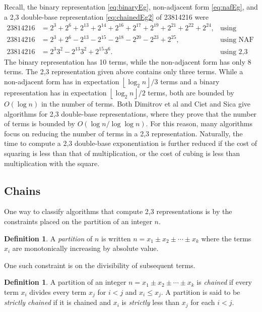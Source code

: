 \documentclass{ucalgthes1}
\theoremstyle{definition}
\newtheorem{defn}[thm]{Definition}
\newcommand{\floor}[1]{\left\lfloor #1 \right\rfloor}
\begin{document}
Recall, the binary representation \eqref{eq:binaryEg}, non-adjacent form \eqref{eq:nafEg}, and a 2,3 double-base representation \eqref{eq:chainedEg2} of 23814216 were
\begin{align*}
	23814216 &= 2^3+2^6+2^{13}+2^{14}+2^{16}+2^{17}+2^{19}+2^{21}+2^{22}+2^{24}, & \mbox{using binary} \\
	23814216 &= 2^3+2^6-2^{13}-2^{15}-2^{18}-2^{20}-2^{23}+2^{25}, & \mbox{using NAF} \\
	23814216 &= 2^3 3^2 -2^{13} 3^2 +2^{15} 3^6. & \mbox{using 2,3 DBNS}
\end{align*}
The binary representation has 10 terms, while the non-adjacent form has only 8 terms.  The 2,3 representation given above contains only three terms.  While a non-adjacent form has in expectation $\floor{\log_2 n}/3$ terms and a binary representation has in expectation $\floor{\log_2 n}/2$ terms, both are bounded by $O(\log n)$ in the number of terms.  Both Dimitrov et al \cite{Dimitrov2008} and Ciet and Sica \cite{Ciet2005} give algorithms for 2,3 double-base representations, where they prove that the number of terms is bounded by $O(\log n / \log \log n)$.  For this reason, many algorithms focus on reducing the number of terms in a 2,3 representation.   Naturally, the time to compute a 2,3 double-base exponentiation is further reduced if the cost of squaring is less than that of multiplication, or the cost of cubing is less than multiplication with the square.

\bigbreak
\subsection{Chains}
\label{subsec:dbnsChains}

One way to classify algorithms that compute 2,3 representations is by the constraints placed on the partition of an integer $n$.

\begin{defn}
A \emph{partition} of $n$ is written $n = x_1 \pm x_2 \pm \cdots \pm x_k$ where the terms $x_i$ are monotonically increasing by absolute value.
\end{defn}

\noindent
One such constraint is on the divisibility of subsequent terms.

\begin{defn}
\label{defn:chained}
A partition of an integer $n = x_1 \pm x_2 \pm \cdots \pm x_k$ is \emph{chained} if every term $x_i$ divides every term $x_j$ for $i < j$ and $x_i \le x_j$. A partition is said to be \emph{strictly chained} if it is chained and $x_i$ is \emph{strictly} less than $x_j$ for each $i < j$.
\end{defn}
\end{document}

